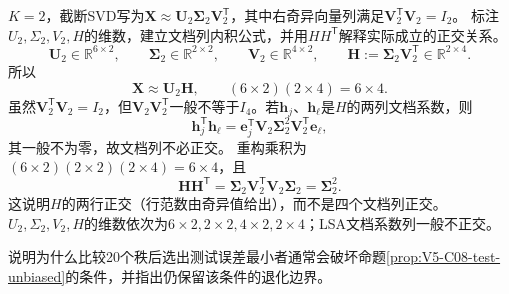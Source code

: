 \begin{solution}
\SolGiven $K=2$，截断SVD写为$\boldsymbol X\approx\boldsymbol U_2\boldsymbol\Sigma_2\boldsymbol V_2^{\mathsf T}$，其中右奇异向量列满足$\boldsymbol V_2^{\mathsf T}\boldsymbol V_2=I_2$。
\SolPlan 标注$U_2,\Sigma_2,V_2,H$的维数，建立文档列内积公式，并用$HH^{\mathsf T}$解释实际成立的正交关系。
\SolDerive
\[
\boldsymbol U_2\in\mathbb R^{6\times2},\qquad
\boldsymbol\Sigma_2\in\mathbb R^{2\times2},\qquad
\boldsymbol V_2\in\mathbb R^{4\times2},\qquad
\boldsymbol H:=\boldsymbol\Sigma_2\boldsymbol V_2^{\mathsf T}\in\mathbb R^{2\times4}.
\]
所以
\[
\boldsymbol X\approx\boldsymbol U_2\boldsymbol H,
\qquad (6\times2)(2\times4)=6\times4.
\]
虽然$\boldsymbol V_2^{\mathsf T}\boldsymbol V_2=I_2$，但$\boldsymbol V_2\boldsymbol V_2^{\mathsf T}$一般不等于$I_4$。若$\boldsymbol h_j$、$\boldsymbol h_\ell$是$H$的两列文档系数，则
\[
\boldsymbol h_j^{\mathsf T}\boldsymbol h_\ell
=\boldsymbol e_j^{\mathsf T}\boldsymbol V_2\boldsymbol\Sigma_2^2
\boldsymbol V_2^{\mathsf T}\boldsymbol e_\ell,
\]
其一般不为零，故文档列不必正交。
\SolCheck 重构乘积为$(6\times2)(2\times2)(2\times4)=6\times4$，且
\[
\boldsymbol H\boldsymbol H^{\mathsf T}
=\boldsymbol\Sigma_2\boldsymbol V_2^{\mathsf T}\boldsymbol V_2\boldsymbol\Sigma_2
=\boldsymbol\Sigma_2^2.
\]
这说明$H$的两行正交（行范数由奇异值给出），而不是四个文档列正交。
\SolAnswer $U_2,\Sigma_2,V_2,H$的维数依次为$6\times2,2\times2,4\times2,2\times4$；LSA文档系数列一般不正交。
\end{solution}
\begin{example}[锁定测试的条件无偏]\label{exm:V5-C08-holdout}
说明为什么比较20个秩后选出测试误差最小者通常会破坏命题\ref{prop:V5-C08-test-unbiased}的条件，并指出仍保留该条件的退化边界。
\end{example}
